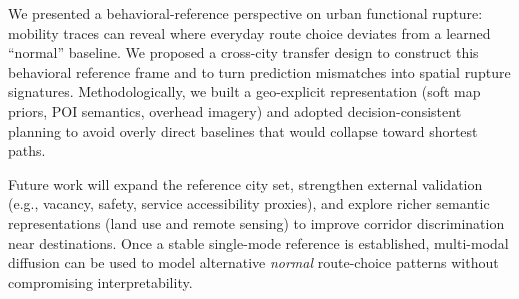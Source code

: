 We presented a behavioral-reference perspective on urban functional rupture: mobility traces can reveal where everyday route choice deviates from a learned ``normal'' baseline. We proposed a cross-city transfer design to construct this behavioral reference frame and to turn prediction mismatches into spatial rupture signatures. Methodologically, we built a geo-explicit representation (soft map priors, POI semantics, overhead imagery) and adopted decision-consistent planning to avoid overly direct baselines that would collapse toward shortest paths.

Future work will expand the reference city set, strengthen external validation (e.g., vacancy, safety, service accessibility proxies), and explore richer semantic representations (land use and remote sensing) to improve corridor discrimination near destinations. Once a stable single-mode reference is established, multi-modal diffusion can be used to model alternative \emph{normal} route-choice patterns without compromising interpretability.
